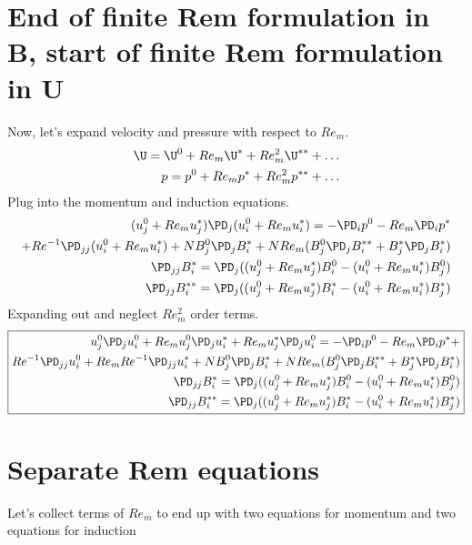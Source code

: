 \documentclass[11pt]{article}
\begin{document}
\section{End of finite Rem formulation in B, start of finite Rem formulation in U}
Now, let's expand velocity and pressure with respect to $Re_m$.
\begin{equation}\begin{aligned}
	\U = \U^0 + Re_m \U^* + Re_m^2 \U^{**} + \hdots \\
	p = p^0 + Re_m p^* + Re_m^2 p^{**} + \hdots
\end{aligned} \end{equation}
Plug into the momentum and induction equations.
\begin{equation}\begin{aligned}
(u_j^0+Re_m u_j^*)\PD_j (u_i^0+Re_m u_i^*) =-\PD_i p^0-Re_m\PD_i p^* \\ + Re^{-1} \PD_{jj} (u_i^0+Re_m u_i^*) + N B_j^0 \PD_j B_i^* + N Re_m ( B_j^0 \PD_j B_i^{**} + B_j^* \PD_j B_i^* ) \\
\PD_{jj} B_i^{*}  = \PD_j ((u_j^0+Re_m u_j^*) B_i^{0} - (u_i^0+Re_m u_i^*) B_j^{0}) \\
\PD_{jj} B_i^{**} = \PD_j ((u_j^0+Re_m u_j^*) B_i^{*} - (u_i^0+Re_m u_i^*) B_j^{*}) \\
\end{aligned}\end{equation}
Expanding out and neglect $Re_m^2$ order terms.
\begin{equation}\boxed{\begin{aligned}
u_j^0 \PD_j u_i^0 + Re_m u_j^0 \PD_j u_i^* + Re_m u_j^* \PD_j u_i^0 = -\PD_i p^0 - Re_m\PD_i p^*+  \\
Re^{-1} \PD_{jj} u_i^0 + Re_m Re^{-1} \PD_{jj} u_i^*
+ N B_j^0 \PD_j B_i^* + N Re_m ( B_j^0 \PD_j B_i^{**} + B_j^* \PD_j B_i^* )
\\
\PD_{jj} B_i^{*}  = \PD_j ((u_j^0+Re_m u_j^*) B_i^{0} - (u_i^0+Re_m u_i^*) B_j^{0}) \\
\PD_{jj} B_i^{**} = \PD_j ((u_j^0+Re_m u_j^*) B_i^{*} - (u_i^0+Re_m u_i^*) B_j^{*}) \\
\end{aligned}}\end{equation}


\section{Separate Rem equations}

Let's collect terms of $Re_m$ to end up with two equations for momentum and two equations for induction
\end{document}
